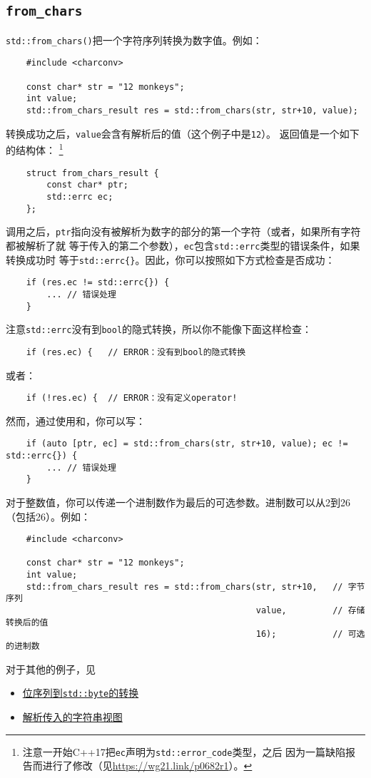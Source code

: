 \subsection{\texttt{from\_chars}}\label{ch31.2.1}
\texttt{std::from\_chars()}把一个字符序列转换为数字值。例如：
\begin{lstlisting}
    #include <charconv>

    const char* str = "12 monkeys";
    int value;
    std::from_chars_result res = std::from_chars(str, str+10, value);
\end{lstlisting}
转换成功之后，\texttt{value}会含有解析后的值（这个例子中是\texttt{12}）。
返回值是一个如下的结构体：
\footnote{注意一开始C++17把\texttt{ec}声明为\texttt{std::error\_code}类型，之后
因为一篇缺陷报告而进行了修改（见\url{https://wg21.link/p0682r1}）。}
\begin{lstlisting}
    struct from_chars_result {
        const char* ptr;
        std::errc ec;
    };
\end{lstlisting}
调用之后，\texttt{ptr}指向没有被解析为数字的部分的第一个字符（或者，如果所有字符都被解析了就
等于传入的第二个参数），\texttt{ec}包含\texttt{std::errc}类型的错误条件，如果转换成功时
等于\texttt{std::errc\{\}}。因此，你可以按照如下方式检查是否成功：
\begin{lstlisting}
    if (res.ec != std::errc{}) {
        ... // 错误处理
    }
\end{lstlisting}
注意\texttt{std::errc}没有到\texttt{bool}的隐式转换，所以你不能像下面这样检查：
\begin{lstlisting}
    if (res.ec) {   // ERROR：没有到bool的隐式转换
\end{lstlisting}
或者：
\begin{lstlisting}
    if (!res.ec) {  // ERROR：没有定义operator!
\end{lstlisting}
然而，通过使用和，你可以写：
\begin{lstlisting}
    if (auto [ptr, ec] = std::from_chars(str, str+10, value); ec != std::errc{}) {
        ... // 错误处理
    }
\end{lstlisting}
对于整数值，你可以传递一个进制数作为最后的可选参数。进制数可以从2到26（包括26）。例如：
\begin{lstlisting}
    #include <charconv>

    const char* str = "12 monkeys";
    int value;
    std::from_chars_result res = std::from_chars(str, str+10,   // 字节序列
                                                 value,         // 存储转换后的值
                                                 16);           // 可选的进制数
\end{lstlisting}
对于其他的例子，见
\begin{itemize}
    \item \hyperref[位序列到byte]{位序列到\texttt{std::byte}的转换}
    \item \hyperref[改进asInt]{解析传入的字符串视图}
\end{itemize}

